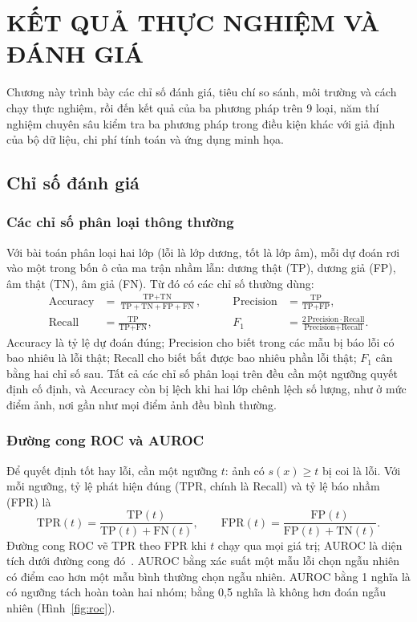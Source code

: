 \chapter{KẾT QUẢ THỰC NGHIỆM VÀ ĐÁNH GIÁ}

Chương này trình bày các chỉ số đánh giá, tiêu chí so sánh, môi trường và cách chạy thực nghiệm, rồi đến kết quả của
ba phương pháp trên 9 loại, năm thí nghiệm chuyên sâu kiểm tra ba phương pháp trong điều kiện khác với giả định của
bộ dữ liệu, chi phí tính toán và ứng dụng minh họa.

\section{Chỉ số đánh giá}
\label{sec:danh-gia}

\subsection{Các chỉ số phân loại thông thường}

Với bài toán phân loại hai lớp (lỗi là lớp dương, tốt là lớp âm), mỗi dự đoán rơi vào một trong bốn ô của ma trận
nhầm lẫn: dương thật (TP), dương giả (FP), âm thật (TN), âm giả (FN). Từ đó có các chỉ số thường dùng:
\begin{equation}
  \begin{aligned}
    \text{Accuracy} &= \frac{\text{TP}+\text{TN}}{\text{TP}+\text{TN}+\text{FP}+\text{FN}}, &\qquad
    \text{Precision} &= \frac{\text{TP}}{\text{TP}+\text{FP}}, \\
    \text{Recall} &= \frac{\text{TP}}{\text{TP}+\text{FN}}, &\qquad
    F_1 &= \frac{2\,\text{Precision}\cdot\text{Recall}}{\text{Precision}+\text{Recall}} .
  \end{aligned}
  \label{eq:prf}
\end{equation}
Accuracy là tỷ lệ dự đoán đúng; Precision cho biết trong các mẫu bị báo lỗi có bao nhiêu là lỗi thật; Recall cho
biết bắt được bao nhiêu phần lỗi thật; $F_1$ cân bằng hai chỉ số sau. Tất cả các chỉ số phân loại trên đều
cần một ngưỡng quyết định cố định, và Accuracy còn bị lệch khi hai lớp chênh lệch số lượng, như ở mức điểm ảnh, nơi
gần như mọi điểm ảnh đều bình thường.

\subsection{Đường cong ROC và AUROC}

Để quyết định tốt hay lỗi, cần một ngưỡng $t$: ảnh có $s(x) \ge t$ bị coi là lỗi. Với mỗi ngưỡng, tỷ lệ phát hiện
đúng (TPR, chính là Recall) và tỷ lệ báo nhầm (FPR) là
\begin{equation}
  \text{TPR}(t) = \frac{\text{TP}(t)}{\text{TP}(t) + \text{FN}(t)}, \qquad
  \text{FPR}(t) = \frac{\text{FP}(t)}{\text{FP}(t) + \text{TN}(t)} .
  \label{eq:tpr-fpr}
\end{equation}
Đường cong ROC vẽ TPR theo FPR khi $t$ chạy qua mọi giá trị; AUROC là diện tích dưới đường cong
đó~\cite{fawcettIntroductionROCAnalysis2006}. AUROC bằng xác suất một mẫu lỗi chọn ngẫu nhiên có điểm cao hơn một
mẫu bình thường chọn ngẫu nhiên. AUROC bằng 1 nghĩa là có ngưỡng tách hoàn toàn hai nhóm; bằng 0,5 nghĩa là
không hơn đoán ngẫu nhiên (Hình~\ref{fig:roc}).

